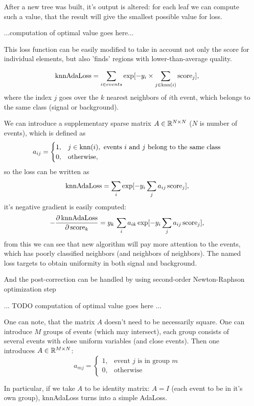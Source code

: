 After a new tree was built, it's output is altered: for each leaf we can compute such a value, that the result will give the smallest possible value for loss.

...computation of optimal value goes here...

This loss function can be easily modified to take in account not only the score for individual elements, but also 'finds' regions with lower-than-average quality.

\[
	\text{knnAdaLoss} = \sum_{i \in events} \exp[-y_i \times \sum_{j \in \text{knn}(i)} \text{score}_j],
\]
where the index $j$ goes over the $k$ nearest neighbors of $i$th event, which belongs to the same class (signal or background).

We can introduce a supplementary sparse matrix $A \in \mathbb{R}^{N \times N}$ ($N$ is number of events), which is defined as 
\[
a_{ij} = \begin{cases} 
1, & j \in \text{knn}(i), \text{ events $i$ and $j$ belong to the same class} \\
0, & \text{otherwise},
\end{cases}
\] so the loss can be written as
\[
	\text{knnAdaLoss} = \sum_i \exp [- y_i \sum_j a_{ij} \, \text{score}_j ],
\]
it's negative gradient is easily computed:
\[
	-\dfrac{\partial \, \text{knnAdaLoss}} {\partial \, \text{score}_k} = 
	 y_k \, \sum_i a_{ik} \exp [- y_i \sum_j a_{ij} \, \text{score}_j ],
\]
from this we can see that new algorithm will pay more attention to the events, which has poorly classified neighbors (and neighbors of neighbors). The named loss targets to obtain uniformity in both signal and background.

And the post-correction can be handled by using second-order Newton-Raphson optimization step 

... TODO computation of optimal value goes here ...

One can note, that the matrix $A$ doesn't need to be necessarily square. One can introduce $M$ groups of events (which may intersect), each group consists of several events with close uniform variables (and close events). Then one introduces $A \in \mathbb{R}^{M \times N}$:
\[
	a_{mj} = \begin{cases}
		1, & \text{event $j$ is in group $m$} \\
		0, & \text{otherwise}
	\end{cases}
\]

In particular, if we take $A$ to be identity matrix: $A = I$ (each event to be in it's own group), knnAdaLoss turns into a simple AdaLoss.



